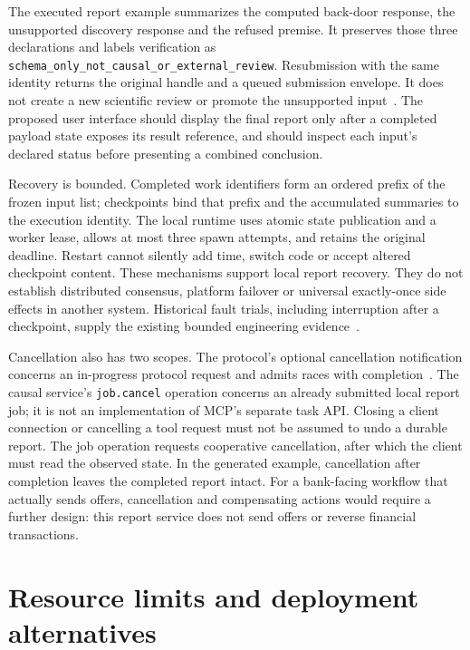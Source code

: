 The executed report example summarizes the computed back-door response,
the unsupported discovery response and the refused premise. It preserves
those three declarations and labels verification as
\texttt{schema\_only\_not\_causal\_or\_external\_review}. Resubmission with
the same identity returns the original handle and a queued submission
envelope. It does not create a new scientific review or promote the
unsupported input~\citep{exec13_i2_examples}. The proposed user interface
should display the final report only after a completed payload state exposes
its result reference, and should inspect each input's declared status before
presenting a combined conclusion.

Recovery is bounded. Completed work identifiers form an ordered prefix of
the frozen input list; checkpoints bind that prefix and the accumulated
summaries to the execution identity. The local runtime uses atomic state
publication and a worker lease, allows at most three spawn attempts, and
retains the original deadline. Restart cannot silently add time, switch code
or accept altered checkpoint content. These mechanisms support local report
recovery. They do not establish distributed consensus, platform failover or
universal exactly-once side effects in another system. Historical fault
trials, including interruption after a checkpoint, supply the existing
bounded engineering evidence~\citep{v12_in_runtime}.

Cancellation also has two scopes. The protocol's optional cancellation
notification concerns an in-progress protocol request and admits races with
completion~\citep{v12_mcp_legacy_cancellation}. The causal service's
\texttt{job.cancel} operation concerns an already submitted local report
job; it is not an implementation of MCP's separate task API. Closing a
client connection or cancelling a tool request must not be assumed to undo
a durable report. The job operation requests cooperative cancellation,
after which the client must read the observed state. In the generated
example, cancellation after completion leaves the completed report intact.
For a bank-facing workflow that actually sends offers, cancellation and
compensating actions would require a further design: this report service
does not send offers or reverse financial transactions.

\section{Resource limits and deployment alternatives}

